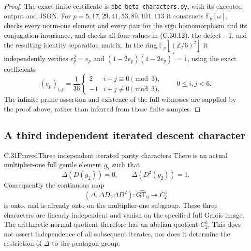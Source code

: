 \begin{proof}
The exact finite certificate is
\texttt{pbc\_beta\_characters.py}, with its executed output and JSON.
For $p=5,17,29,41,53,89,101,113$ it constructs
$\mathbb F_p[\omega]$, checks every norm-one element and every pair
for the sign homomorphism and its conjugation invariance, and checks
all four values in (C.30.12), the defect $-1$, and the resulting
identity separation matrix. In the ring
$\mathbb F_p[(\mathbb Z/6)^2]$ it independently verifies
$e_p^2=e_p$ and $(1-2e_p)(1-2e_p)^*=1$, using the exact coefficients
\[
 (e_p)_{i,j}=\frac1{36}
 \begin{cases}2&i+j\equiv0\pmod3,\\-1&i+j\not\equiv0\pmod3,
 \end{cases}
 \qquad 0\leq i,j<6.
 \tag{C.30.14}
\]
The infinite-prime assertion and existence of the full witnesses
are supplied by the proof above, rather than inferred from those
finite samples.
\end{proof}


\subsection{A third independent iterated descent character}

\begin{statement}{C.31}{Proved}{Three independent iterated parity characters}
There is an actual multiplier-one full gentle element $g_2$ such that
\[
                 \Delta(D(g_2))=0,\qquad
                 \Delta(D^2(g_2))=1.
 \tag{C.31.1}
\]
Consequently the continuous map
\[
 (\Delta,\Delta D,\Delta D^2):
       \widehat{\mathrm{GT}}_0\twoheadrightarrow C_2^3
 \tag{C.31.2}
\]
is onto, and is already onto on the multiplier-one subgroup.
These three characters are linearly independent and vanish
on the specified full Galois image. The arithmetic-normal quotient
therefore has an abelian quotient $C_2^3$.
This does not assert independence of all subsequent iterates, nor
does it determine the restriction of $\Delta$ to the pentagon group.
\end{statement}

